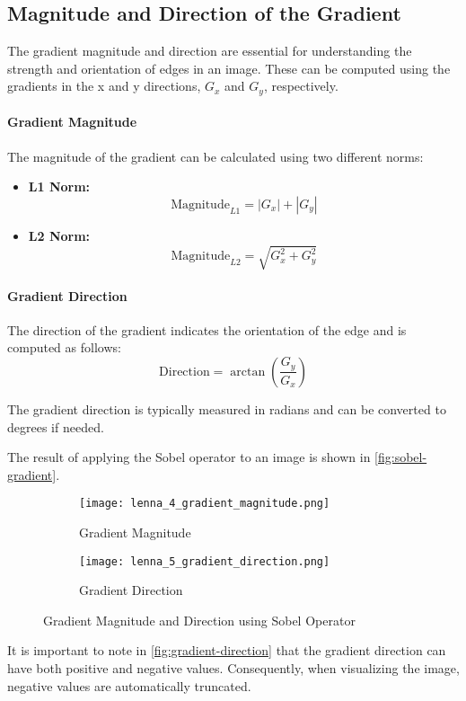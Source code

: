 \subsection{Magnitude and Direction of the Gradient}
\label{subsec:magnitude-and-direction}

The gradient magnitude and direction are essential for understanding the strength and orientation of edges in an image. These can be computed using the gradients in the x and y directions, \( G_x \) and \( G_y \), respectively.

\paragraph{Gradient Magnitude}
The magnitude of the gradient can be calculated using two different norms:

\begin{itemize}
    \item \textbf{L1 Norm:}
          \begin{equation}
              \text{Magnitude}_{L1} = |G_x| + |G_y|
              \label{eq:grad-magnitude-l1}
          \end{equation}
    \item \textbf{L2 Norm:}
          \begin{equation}
              \text{Magnitude}_{L2} = \sqrt{G_x^2 + G_y^2}
              \label{eq:grad-magnitude-l2}
          \end{equation}
\end{itemize}

\paragraph{Gradient Direction}
The direction of the gradient indicates the orientation of the edge and is computed as follows:
\begin{equation}
    \text{Direction} = \arctan\left(\frac{G_y}{G_x}\right)
    \label{eq:grad-direction}
\end{equation}

The gradient direction is typically measured in radians and can be converted to degrees if needed.

The result of applying the Sobel operator to an image is shown in \autoref{fig:sobel-gradient}.

\begin{figure}[ht]
    \centering
    \begin{subfigure}[b]{0.4\textwidth}
        \centering
        \texttt{[image: lenna\_4\_gradient\_magnitude.png]}
        \caption{Gradient Magnitude}
        \label{fig:gradient-magnitude}
    \end{subfigure}
    \hfill
    \begin{subfigure}[b]{0.4\textwidth}
        \centering
        \texttt{[image: lenna\_5\_gradient\_direction.png]}
        \caption{Gradient Direction}
        \label{fig:gradient-direction}
    \end{subfigure}
    \caption{Gradient Magnitude and Direction using Sobel Operator}
    \label{fig:sobel-gradient}
\end{figure}


It is important to note in \autoref{fig:gradient-direction} that the gradient direction can have both positive and negative values. Consequently, when visualizing the image, negative values are automatically truncated.
